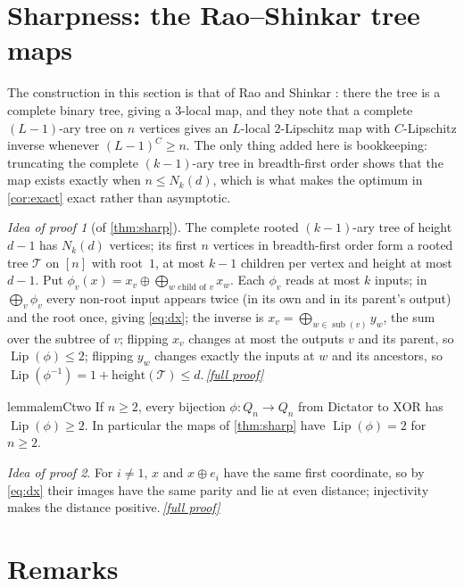 \documentclass[11pt,a4paper]{article}
\theoremstyle{plain}
\theoremstyle{definition}
\theoremstyle{remark}
\newtheorem*{proofidea}{Idea of proof}
\newcommand{\fullproofref}[1]{\,\hyperref[#1]{\textit{[full proof]}}}
\newcommand{\Lip}{\operatorname{Lip}}
\newcommand{\Dict}{\mathrm{Dictator}}
\newcommand{\XOR}{\mathrm{XOR}}
\newcommand{\sub}{\operatorname{sub}}
\begin{document}
\section{Sharpness: the Rao--Shinkar tree maps}\label{sec:sharp}

The construction in this section is that of Rao and Shinkar \cite[Theorem~2 and Appendix~A]{RS18}: there the tree is a complete binary tree, giving a $3$-local map, and they note that a complete $(L-1)$-ary tree on $n$ vertices gives an $L$-local $2$-Lipschitz map with $C$-Lipschitz inverse whenever $(L-1)^C\ge n$. The only thing added here is bookkeeping: truncating the complete $(k-1)$-ary tree in breadth-first order shows that the map exists exactly when $n\le N_k(d)$, which is what makes the optimum in \cref{cor:exact} exact rather than asymptotic.

\begin{proofidea}[of \cref{thm:sharp}]
The complete rooted $(k-1)$-ary tree of height $d-1$ has $N_k(d)$ vertices; its first $n$ vertices in breadth-first order form a rooted tree $\mathcal T$ on $[n]$ with root~$1$, at most $k-1$ children per vertex and height at most $d-1$. Put $\phi_v(x)=x_v\oplus\bigoplus_{w\text{ child of }v}x_w$. Each $\phi_v$ reads at most $k$ inputs; in $\bigoplus_v\phi_v$ every non-root input appears twice (in its own and in its parent's output) and the root once, giving \eqref{eq:dx}; the inverse is $x_v=\bigoplus_{w\in\sub(v)}y_w$, the sum over the subtree of $v$; flipping $x_v$ changes at most the outputs $v$ and its parent, so $\Lip(\phi)\le2$; flipping $y_w$ changes exactly the inputs at $w$ and its ancestors, so $\Lip(\phi^{-1})=1+\text{height}(\mathcal T)\le d$.\fullproofref{pf:sharp}
\end{proofidea}

\begin{restatable}{lemma}{lemCtwo}\label{lem:C2}
If $n\ge2$, every bijection $\phi\colon Q_n\to Q_n$ from $\Dict$ to $\XOR$ has $\Lip(\phi)\ge2$. In particular the maps of \cref{thm:sharp} have $\Lip(\phi)=2$ for $n\ge2$.
\end{restatable}
\begin{proofidea}
For $i\ne1$, $x$ and $x\oplus e_i$ have the same first coordinate, so by \eqref{eq:dx} their images have the same parity and lie at even distance; injectivity makes the distance positive.\fullproofref{pf:C2}
\end{proofidea}

\section{Remarks}
\end{document}
